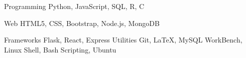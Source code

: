 \vspace{3mm}
\begin{cvskills}

  \cvskill
  {Programming}
  {Python, JavaScript, SQL, R, C}
  
  \cvskill
  {Web}
  {HTML5, CSS, Bootstrap, Node.js, MongoDB}

  \cvskill
  {Frameworks}
  {Flask, React, Express}
  \cvskill
  {Utilities}
  {Git, \LaTeX, MySQL WorkBench, Linux Shell, Bash Scripting, Ubuntu}

\end{cvskills}